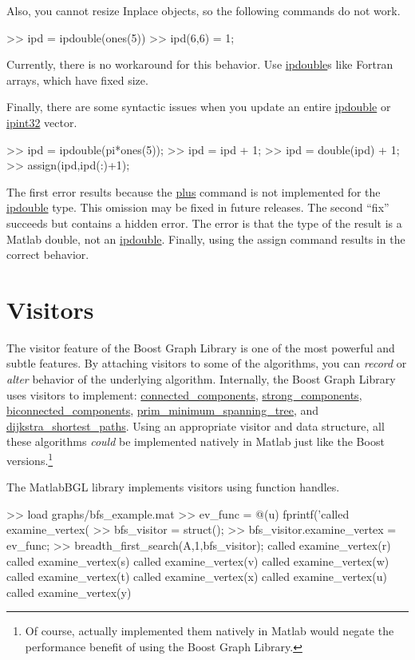 \documentclass[12pt]{article}
\newcommand{\mycmd}[1]{\url{#1}}
\begin{document}
Also, you cannot resize Inplace objects, so the following commands do not work.
\begin{mcode}
>> ipd = ipdouble(ones(5)) %
>> ipd(6,6) = 1;           %
\end{mcode}
Currently, there is no workaround for this behavior.  Use \mycmd{ipdouble}s like Fortran arrays, which have fixed size.

Finally, there are some syntactic issues when you update an entire \mycmd{ipdouble} or \mycmd{ipint32} vector.
\begin{mcode}
>> ipd = ipdouble(pi*ones(5));  %
>> ipd = ipd + 1;               %
>> ipd = double(ipd) + 1;       %
>> assign(ipd,ipd(:)+1);        %
\end{mcode}
The first error results because the \mycmd{plus} command is not implemented for the \mycmd{ipdouble} type.  This omission may be fixed in future releases.
The second ``fix'' succeeds but contains a hidden error.  The error is that the type of the result is a Matlab double, not an \mycmd{ipdouble}.  Finally, using the assign command results in the correct behavior.

\section{Visitors}
The visitor feature of the Boost Graph Library is one of the most powerful and subtle features.  By attaching visitors to some of the algorithms, you can \emph{record} or \emph{alter} behavior of the underlying algorithm.  Internally, the Boost Graph Library uses visitors to implement: \mycmd{connected_components}, \mycmd{strong_components}, \mycmd{biconnected_components}, \mycmd{prim_minimum_spanning_tree},  and \mycmd{dijkstra_shortest_paths}.  Using an appropriate visitor and data structure, all these algorithms \emph{could} be implemented natively in Matlab just like the Boost versions.\footnote{Of course, actually implemented them natively in Matlab would negate the performance benefit of using the Boost Graph Library.}

The MatlabBGL library implements visitors using function handles.
\begin{mcode}
>> load graphs/bfs_example.mat
>> ev_func = @(u) fprintf('called examine_vertex(%
>> bfs_visitor = struct();
>> bfs_visitor.examine_vertex = ev_func;
>> breadth_first_search(A,1,bfs_visitor);
called examine_vertex(r)
called examine_vertex(s)
called examine_vertex(v)
called examine_vertex(w)
called examine_vertex(t)
called examine_vertex(x)
called examine_vertex(u)
called examine_vertex(y)
\end{mcode}
\end{document}

